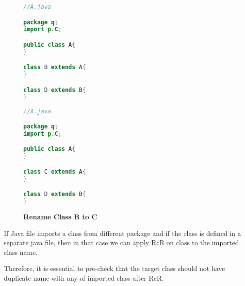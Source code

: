 \begin{figure}[th]
\centering
\begin{minipage}[t]{0.45\linewidth}
\begin{lstlisting}[language=java, basicstyle=\scriptsize\ttfamily,frame=single]	
//A.java

package q;
import p.C;

public class A{	
}

class B extends A{	
}

class D extends B{
}
\end{lstlisting}
\end{minipage}
\hfill
\begin{minipage}[t]{0.45\linewidth}
\begin{lstlisting}[language=java, basicstyle=\scriptsize\ttfamily,frame=single]
//A.java

package q;
import p.C;

public class A{	
}

class C extends A{	
}

class D extends B{
}	
\end{lstlisting}
\end{minipage}
\caption{\textbf{Rename Class B to C}}
\label{figure:figpc3_1}
\end{figure}

If Java file imports a class from different package and if the class is defined in a separate java file, then in that case we can apply RcR on class to the imported class name.

Therefore, it is essential to pre-check that the target class should not have duplicate name with any of imported class after RcR.

